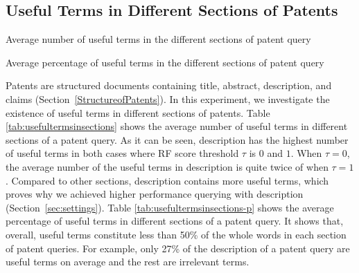 \subsection{Useful Terms in Different Sections of Patents}
\begin{table}[t!]
  \begin{center}
   \caption{Average number of useful terms in the different sections of patent query}
     
  \label{tab:usefultermsinsections}
  \end{center}  
\end{table}
\begin{table}[t!]
  \begin{center}
   \caption{Average percentage of useful terms in the different sections of patent query}
     
  \label{tab:usefultermsinsections-p}
  \end{center}  
\end{table}
Patents are structured documents containing title, abstract, description, and claims (Section~\ref{StructureofPatents}). In this experiment, we investigate the existence of useful terms in different sections of patents. 
Table \ref{tab:usefultermsinsections} shows the average number of useful terms in different sections of a patent query.  
As it can be seen, description has the highest number of useful terms in both cases where RF score threshold $ \tau $ is $0$ and $1$. When $ \tau = 0 $, the average number of the useful terms in description is quite twice of when $ \tau = 1 $. Compared to other sections, description contains more useful terms, which proves why we achieved higher performance querying with description (Section~\ref{sec:settings}).
Table \ref{tab:usefultermsinsections-p} shows the average percentage of useful terms in different sections of a patent query. It shows that, overall, useful terms constitute less than 50\% of the whole words in each section of patent queries. For example, only 27\% of the description of a patent query are useful terms on average and the rest are irrelevant terms. 
